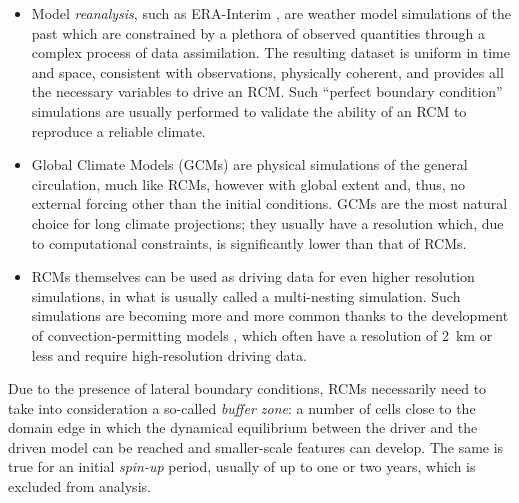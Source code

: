 \begin{itemize}
    \item Model \emph{reanalysis}, such as ERA-Interim \citep{Dee2011}, are weather model simulations of the past which are constrained by a plethora of observed quantities through a complex process of data assimilation. The resulting dataset is uniform in time and space, consistent with observations, physically coherent, and provides all the necessary variables to drive an RCM. Such ``perfect boundary condition'' simulations are usually performed to validate the ability of an RCM to reproduce a reliable climate.
    \item Global Climate Models (GCMs) are physical simulations of the general circulation, much like RCMs, however with global extent and, thus, no external forcing other than the initial conditions. GCMs are the most natural choice for long climate projections; they usually have a resolution which, due to computational constraints, is significantly lower than that of RCMs.
    \item RCMs themselves can be used as driving data for even higher resolution simulations, in what is usually called a multi-nesting simulation. Such simulations are becoming more and more common thanks to the development of convection-permitting models \citep{Prein2015, Clark2016}, which often have a resolution of \SI{2}{\kilo\meter} or less and require high-resolution driving data.
\end{itemize}
Due to the presence of lateral boundary conditions, RCMs necessarily need to take into consideration  a so-called \emph{buffer zone}: a number of cells close to the domain edge in which the dynamical equilibrium between the driver and the driven model can be reached and smaller-scale features can develop. The same is true for an initial \emph{spin-up} period, usually of up to one or two years, which is excluded from analysis.

